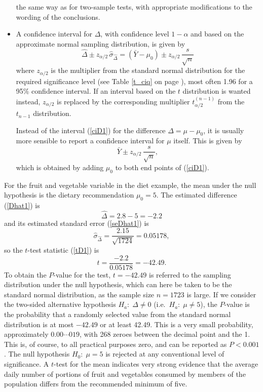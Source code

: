 \begin{itemize}
the same way as for two-sample tests, with appropriate
modifications to the wording of the conclusions.
\item
A confidence interval for $\Delta$, with confidence level $1-\alpha$ and
based on the approximate normal sampling distribution, is given by
\begin{equation}
\hat{\Delta}\pm z_{\alpha/2}\, \hat{\sigma}_{\hat{\Delta}}
=
(\bar{Y}-\mu_{0}) \pm z_{\alpha/2} \, \frac{s}{\sqrt{n}}
\label{ciD1}
\end{equation}
where $z_{\alpha/2}$ is the multiplier from the standard normal
distribution for the required significance level (see Table \ref{t_ciq}
on page \pageref{t_ciq}), most often 1.96 for a 95\% confidence
interval. If an interval based on the $t$ distribution is wanted
instead, $z_{\alpha/2}$ is replaced by the corresponding
multiplier $t_{\alpha/2}^{(n-1)}$ from the $t_{n-1}$ distribution.

Instead of the interval (\ref{ciD1}) for the difference
$\Delta=\mu-\mu_{0}$, it is usually more sensible to report a confidence
interval for $\mu$ itself. This is given by
\begin{equation}
\bar{Y} \pm z_{\alpha/2} \, \frac{s}{\sqrt{n}},
\label{cimu1}
\end{equation}
which is obtained by adding $\mu_{0}$
to both end points of (\ref{ciD1}).
\end{itemize}
For the fruit and vegetable variable in the diet example, the mean under the null
hypothesis is the dietary recommendation $\mu_{0}=5$. The estimated
difference (\ref{Dhat1}) is
\[
\hat{\Delta}=2.8-5=-2.2
\]
and its estimated standard error (\ref{seDhat1}) is
\[
\hat{\sigma}_{\hat{\Delta}}= \frac{2.15}{\sqrt{1724}} = 0.05178,
\]
so the $t$-test statistic (\ref{tD1}) is
\[
t=\frac{-2.2}{0.05178} = -42.49.
\]
To obtain the $P$-value for the test, $t=-42.49$ is referred to the
sampling distribution under the null hypothesis, which can here be taken
to be the standard normal distribution, as the sample size $n=1723$ is
large.
If we consider the
two-sided alternative hypothesis $H_{a}:\; \Delta\ne 0$ (i.e.\ $H_{a}:\;
\mu\ne5$), the $P$-value is the probability that a randomly selected value
from the standard normal distribution is at most $-42.49$ or at least
42.49. This is a very small probability,
approximately $0.00\cdots019$, with 268 zeroes between the decimal point
and the 1. This is, of course, to all practical purposes zero, and can
be reported as $P<0.001$. The null hypothesis $H_{0}:\; \mu=5$ is
rejected at any conventional level of significance. A $t$-test for the
mean indicates very strong evidence that the average daily number of
portions of fruit and vegetables consumed by members of the population
differs from the recommended minimum of five.

